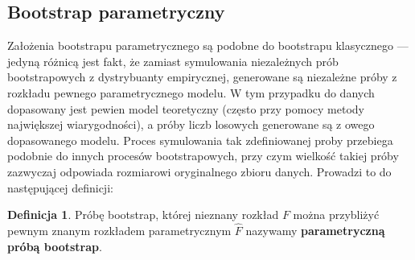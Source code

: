 \documentclass[inzynierska]{pwr_wmat_praca_dyplomowa}
\theoremstyle{plain}
\numberwithin{theorem}{chapter}
\theoremstyle{definition}
\numberwithin{theorem}{chapter}
\newtheorem{definition}[theorem]{Definicja}
\begin{document}
\subsection{Bootstrap parametryczny}
Założenia bootstrapu parametrycznego są podobne do bootstrapu klasycznego --- jedyną różnicą jest fakt, że zamiast symulowania niezależnych prób bootstrapowych z dystrybuanty empirycznej, generowane są niezależne próby z rozkładu pewnego parametrycznego modelu. 
W tym przypadku do danych dopasowany jest pewien model teoretyczny (często przy pomocy metody największej wiarygodności), a próby liczb losowych generowane są z owego dopasowanego modelu. Proces symulowania tak zdefiniowanej proby przebiega podobnie do innych procesów bootstrapowych, przy czym wielkość takiej próby zazwyczaj odpowiada rozmiarowi oryginalnego zbioru danych. Prowadzi to do następującej definicji:
\begin{definition}
	Próbę bootstrap, której nieznany rozkład $F$ można przybliżyć pewnym znanym rozkładem parametrycznym $\hat{F}$ nazywamy \textbf{parametryczną próbą bootstrap}. 
\end{definition}
 
\end{document}
